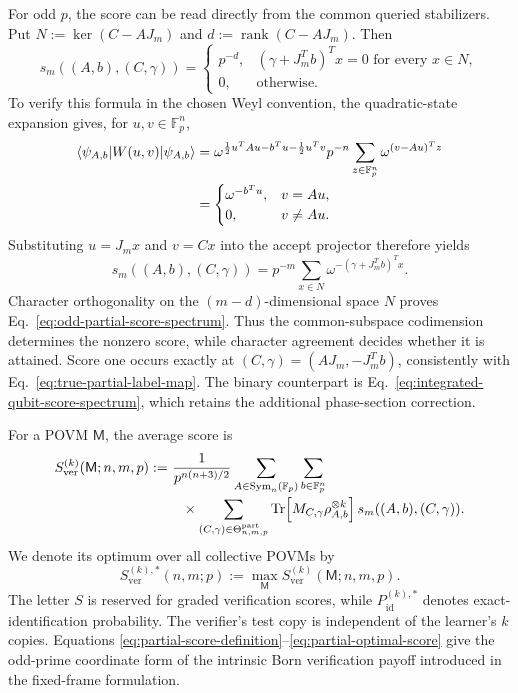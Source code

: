 \documentclass[11pt]{article}
\newcommand{\F}{\mathbb F}
\newcommand{\Sym}{\operatorname{Sym}}
\newcommand{\rank}{\operatorname{rank}}
\newcommand{\Tr}{\operatorname{Tr}}
\newcommand{\1}{\mathbf 1}
\theoremstyle{plain}
\theoremstyle{definition}
\theoremstyle{remark}
\begin{document}
For odd $p$, the score can be read directly from the common queried
stabilizers.  Put $N:=\ker(C-AJ_m)$ and $d:=\rank(C-AJ_m)$.
Then
\begin{equation}
 s_m((A,b),(C,\gamma))
 =\begin{cases}
 p^{-d},& (\gamma+J_m^Tb)^Tx=0\text{ for every }x\in N,\\
 0,&\text{otherwise}.
 \end{cases}
 \label{eq:odd-partial-score-spectrum}
\end{equation}
To verify this formula in the chosen Weyl convention, the quadratic-state
expansion gives, for $u,v\in\F_p^n$,
\begin{align}
 \langle\psi_{A,b}|W(u,v)|\psi_{A,b}\rangle
 &=\omega^{\frac12u^TAu-b^Tu-\frac12u^Tv}
 p^{-n}\sum_{z\in\F_p^n}\omega^{(v-Au)^Tz}\notag\\
 &=\begin{cases}
 \omega^{-b^Tu},&v=Au,\\
 0,&v\ne Au.
 \end{cases}
 \label{eq:odd-Weyl-expectation-bridge}
\end{align}
Substituting $u=J_mx$ and $v=Cx$ into the accept projector therefore yields
\begin{equation}
 s_m((A,b),(C,\gamma))
 =p^{-m}\sum_{x\in N}\omega^{-(\gamma+J_m^Tb)^Tx}.
 \label{eq:odd-partial-score-character-sum}
\end{equation}
Character orthogonality on the $(m-d)$-dimensional space $N$ proves
Eq.~\eqref{eq:odd-partial-score-spectrum}.  Thus the common-subspace
codimension determines the nonzero score, while character agreement decides
whether it is attained.  Score one occurs exactly at
$(C,\gamma)=(AJ_m,-J_m^Tb)$, consistently with
Eq.~\eqref{eq:true-partial-label-map}.  The binary counterpart is
Eq.~\eqref{eq:integrated-qubit-score-spectrum}, which retains the additional
phase-section correction.

For a POVM $\mathsf M$, the average score is
\begin{align}
 S_{\mathrm{ver}}^{(k)}(\mathsf M;n,m,p)
 :=&\ \frac{1}{p^{n(n+3)/2}}
 \sum_{A\in\Sym_n(\F_p)}\sum_{b\in\F_p^n}
 \notag\\[-2pt]
 &\quad\times
 \sum_{(C,\gamma)\in\Theta_{n,m,p}^{\mathrm{part}}}
 \Tr\!\left[M_{C,\gamma}\rho_{A,b}^{\otimes k}\right]
 s_m((A,b),(C,\gamma)).
 \label{eq:partial-average-score}
\end{align}
We denote its optimum over all collective POVMs by
\begin{equation}
 S_{\mathrm{ver}}^{(k),*}(n,m;p)
 :=\max_{\mathsf M}S_{\mathrm{ver}}^{(k)}(\mathsf M;n,m,p).
 \label{eq:partial-optimal-score}
\end{equation}
The letter $S$ is reserved for graded verification scores, while
$P_{\mathrm{id}}^{(k),*}$ denotes exact-identification probability.  The verifier's
test copy is independent of the learner's $k$ copies.  Equations
\eqref{eq:partial-score-definition}--\eqref{eq:partial-optimal-score} give the
odd-prime coordinate form of the intrinsic Born verification payoff introduced
in the fixed-frame formulation.
\end{document}
